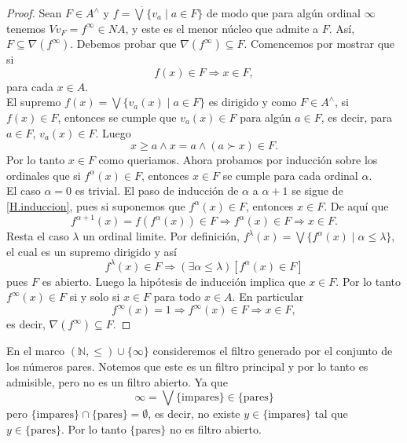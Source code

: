 \begin{proof}
    Sean $F\in A^{\wedge}$ y $f=\dot{\bigvee}\{v_a\mid a\in F\}$ de modo que para algún ordinal $\infty$ tenemos $Vv_F=f^\infty\in NA$, y este es el menor núcleo que admite a $F$. Así, $F\subseteq \nabla(f^\infty)$. Debemos probar que $\nabla(f^\infty)\subseteq F$. Comencemos por mostrar que si 
    \begin{equation}\label{H.induccion}
        f(x)\in F \Rightarrow x\in F,
    \end{equation}
    para cada $x\in A$.\\

    El supremo $f(x)=\bigvee\{v_a(x)\mid a\in F\}$ es dirigido y como $F\in A^\wedge$, si $f(x)\in F$, entonces se cumple que $v_a(x)\in F$ para algún $a\in F$, es decir, para $a\in F$, $v_a(x)\in F$. Luego
    \[
    x\geq a\wedge x=a\wedge (a\succ x)\in F.
    \]
    Por lo tanto $x\in F$ como queriamos. Ahora probamos por inducción sobre los ordinales que si $f^\alpha(x)\in F$, entonces $x\in F$ se cumple para cada ordinal $\alpha$.\\

    El caso $\alpha =0$ es trivial. El paso de inducción de $\alpha$ a $\alpha +1$ se sigue de \ref{H.induccion}, pues si suponemos que $f^\alpha (x)\in F$, entonces $x\in F$. De aquí que 
    \[
    f^{\alpha +1}(x)=f(f^\alpha(x))\in F\Rightarrow f^\alpha(x)\in F\Rightarrow x\in F.
    \]
    Resta el caso $\lambda$ un ordinal limite. Por definición, $f^\lambda (x)=\bigvee\{f^\alpha(x)\mid \alpha\leq \lambda\}$, el cual es un supremo dirigido y así
    \[
    f^\lambda(x)\in F\Rightarrow (\exists \alpha \leq \lambda )[f^\alpha (x)\in F]
    \]
    pues $F$ es abierto. Luego la hipótesis de inducción implica que $x\in F$. Por lo tanto $f^\infty (x)\in F$ si y solo si $x\in F$ para todo $x\in A$. En particular 
    \[
    f^\infty (x)=1\Rightarrow f^\infty (x)\in F\Rightarrow x\in F,
    \]
    es decir, $\nabla(f^\infty )\subseteq F$. 
\end{proof}

\begin{ej}
    En el marco $(\mathbb{N}, \leq)\cup \{\infty\}$ consideremos el filtro generado por el conjunto de los números pares. Notemos que este es un filtro principal y por lo tanto es admisible, pero no es un filtro abierto. Ya que 
    \[
    \infty=\bigvee \{\mbox{impares}\}\in\{\mbox{pares}\}
    \]
    pero $\{\mbox{impares}\}\cap \{\mbox{pares}\}=\emptyset$, es decir, no existe $y\in \{\mbox{impares}\}$ tal que $y\in \{\mbox{pares}\}$. Por lo tanto $\{\mbox{pares}\}$ no es filtro abierto.
\end{ej}

